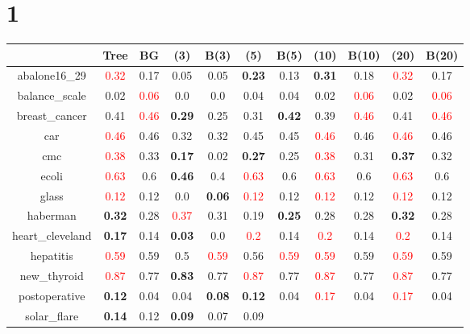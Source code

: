 \documentclass{article}%
\begin{document}
\section*{1}%
\begin{tabular}{c|cccccccccc}%
\hline%
&Tree&BG&(3)&B(3)&(5)&B(5)&(10)&B(10)&(20)&B(20)\\%
\hline%
abalone16\_29&\textcolor{red}{ 
0.32
}&0.17&0.05&0.05&\textbf{0.23}&0.13&\textbf{0.31}&0.18&\textcolor{red}{ 
0.32
}&0.17\\%
\hline%
balance\_scale&0.02&\textcolor{red}{ 
0.06
}&0.0&0.0&0.04&0.04&0.02&\textcolor{red}{ 
0.06
}&0.02&\textcolor{red}{ 
0.06
}\\%
\hline%
breast\_cancer&0.41&\textcolor{red}{ 
0.46
}&\textbf{0.29}&0.25&0.31&\textbf{0.42}&0.39&\textcolor{red}{ 
0.46
}&0.41&\textcolor{red}{ 
0.46
}\\%
\hline%
car&\textcolor{red}{ 
0.46
}&0.46&0.32&0.32&0.45&0.45&\textcolor{red}{ 
0.46
}&0.46&\textcolor{red}{ 
0.46
}&0.46\\%
\hline%
cmc&\textcolor{red}{ 
0.38
}&0.33&\textbf{0.17}&0.02&\textbf{0.27}&0.25&\textcolor{red}{ 
0.38
}&0.31&\textbf{0.37}&0.32\\%
\hline%
ecoli&\textcolor{red}{ 
0.63
}&0.6&\textbf{0.46}&0.4&\textcolor{red}{ 
0.63
}&0.6&\textcolor{red}{ 
0.63
}&0.6&\textcolor{red}{ 
0.63
}&0.6\\%
\hline%
glass&\textcolor{red}{ 
0.12
}&0.12&0.0&\textbf{0.06}&\textcolor{red}{ 
0.12
}&0.12&\textcolor{red}{ 
0.12
}&0.12&\textcolor{red}{ 
0.12
}&0.12\\%
\hline%
haberman&\textbf{0.32}&0.28&\textcolor{red}{ 
0.37
}&0.31&0.19&\textbf{0.25}&0.28&0.28&\textbf{0.32}&0.28\\%
\hline%
heart\_cleveland&\textbf{0.17}&0.14&\textbf{0.03}&0.0&\textcolor{red}{ 
0.2
}&0.14&\textcolor{red}{ 
0.2
}&0.14&\textcolor{red}{ 
0.2
}&0.14\\%
\hline%
hepatitis&\textcolor{red}{ 
0.59
}&0.59&0.5&\textcolor{red}{ 
0.59
}&0.56&\textcolor{red}{ 
0.59
}&\textcolor{red}{ 
0.59
}&0.59&\textcolor{red}{ 
0.59
}&0.59\\%
\hline%
new\_thyroid&\textcolor{red}{ 
0.87
}&0.77&\textbf{0.83}&0.77&\textcolor{red}{ 
0.87
}&0.77&\textcolor{red}{ 
0.87
}&0.77&\textcolor{red}{ 
0.87
}&0.77\\%
\hline%
postoperative&\textbf{0.12}&0.04&0.04&\textbf{0.08}&\textbf{0.12}&0.04&\textcolor{red}{ 
0.17
}&0.04&\textcolor{red}{ 
0.17
}&0.04\\%
\hline%
solar\_flare&\textbf{0.14}&0.12&\textbf{0.09}&0.07&0.09&\textcolor{red}{ 
}
\end{tabular}
\end{document}
